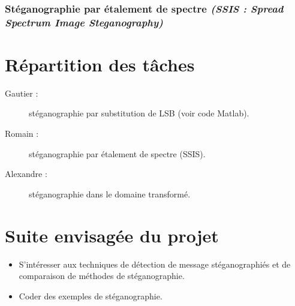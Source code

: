 \documentclass[11pt]{article}
\begin{document}
\subsubsection{Stéganographie par étalement de spectre \emph{(SSIS : Spread Spectrum Image Steganography)}\cite{Patch,ARL-TR-1698}}




\section{Répartition des tâches}
\begin{description}
\item[Gautier :] stéganographie par substitution de LSB (voir code Matlab).
\item[Romain :] stéganographie par étalement de spectre (SSIS).
\item[Alexandre :] stéganographie dans le domaine transformé.
\end{description}

\section{Suite envisagée du projet}
\begin{itemize}
	\item S'intéresser aux techniques de détection de message stéganographiés et de comparaison de méthodes de stéganographie.
	\item Coder des exemples de stéganographie.
\end{itemize}



\end{document}

